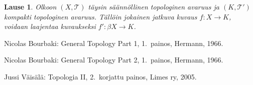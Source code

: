 \documentclass[12pt,a4paper,leqno]{report}
\newcommand{\T}{\mathcal{T}}
\theoremstyle{plain}
\newtheorem{lause}[equation]{Lause}
\newtheorem{lem}[equation]{Lemma}
\newtheorem{kor}[equation]{Korollaari}
\theoremstyle{definition}
\newtheorem{maar}[equation]{Määritelmä}
\newtheorem{esim}[equation]{Esimerkki}
\theoremstyle{remark}
\newtheorem{huom}[equation]{Huomautus}
\begin{document}
\begin{lause}
Olkoon $(X,\T)$ täysin säännöllinen topologinen avaruus ja 
$(K,\T')$ kompakti topologinen avaruus. 
Tällöin jokainen jatkuva kuvaus $f\colon X\rightarrow K$, voidaan laajentaa kuvaukseksi $f'\colon \beta X\rightarrow K$.
\end{lause}




\begin{thebibliography}{9}

Nicolas Bourbaki: General Topology Part 1, 1.\ painos, Hermann, 1966.

Nicolas Bourbaki: General Topology Part 2, 1.\ painos, Hermann, 1966.

%
%
Jussi Väisälä: Topologia II, 2.\ korjattu painos, Limes ry, 2005.



\end{thebibliography}
\end{document}

